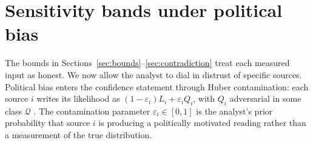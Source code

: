 \section{Sensitivity bands under political bias}\label{sec:bias}

The bounds in Sections~\ref{sec:bounds}--\ref{sec:contradiction} treat each measured input as honest. We now allow the analyst to dial in distrust of specific sources. Political bias enters the confidence statement through Huber contamination: each source $i$ writes its likelihood as $(1-\varepsilon_i)L_i+\varepsilon_i Q_i$, with $Q_i$ adversarial in some class $\mathcal Q$ \citep{huber1964,huber1981,berger1986,gagnon2023}. The contamination parameter $\varepsilon_i\in[0,1]$ is the analyst's prior probability that source $i$ is producing a politically motivated reading rather than a measurement of the true distribution.

